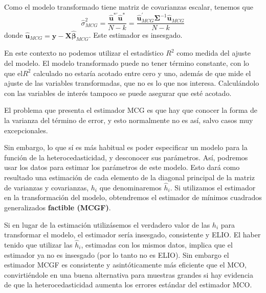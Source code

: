 
Como el modelo transformado tiene matriz de covarianzas escalar, tenemos
que 
\[
\hat{\sigma}_{MCG}^{2}=\dfrac{\hat{\boldsymbol{u}}^{*\prime}\hat{\boldsymbol{u}}^{*}}{N-k}=\dfrac{\hat{\boldsymbol{u}}_{MCG}^{\prime}\boldsymbol{\Sigma}^{-1}\hat{\boldsymbol{u}}_{MCG}}{N-k}
\]
 donde $\hat{\boldsymbol{u}}_{MCG}=\boldsymbol{y}-\boldsymbol{X}\hat{\boldsymbol{\beta}}_{MCG}$.
Este estimador es insesgado.



En este contexto no podemos utilizar el estad\'istico $R^{2}$ como
medida del ajuste del modelo. El modelo transformado puede no tener
t\'ermino constante, con lo que el$R^{2}$ calculado no estar\'ia acotado
entre cero y uno, adem\'as de que mide el ajuste de las variables transformadas,
que no es lo que nos interesa. Calcul\'andolo con las variables de inter\'es
tampoco se puede asegurar que est\'e acotado.



El problema que presenta el estimador MCG es que hay que conocer la forma de la varianza del t\'ermino de error, y esto normalmente no es as\'i, salvo casos muy excepcionales.

Sin embargo, lo que s\'i es m\'as habitual es poder especificar un modelo para la funci\'on de la heterocedasticidad, y desconocer sus par\'ametros. As\'i, podremos usar los datos para estimar los par\'ametros de este modelo. Esto dar\'a como resultado una estimaci\'on de cada elemento de la diagonal principal de la matriz de varianzas y covarianzas, $h_i$ que denominaremos $\hat{h}_i$. Si utilizamos el estimador en la transformaci\'on del modelo, obtendremos el estimador de m\'inimos cuadrados generalizados \textbf{factible (MCGF)}.

Si en lugar de la estimaci\'on utiliz\'asemos el verdadero valor de las $h_i$ para transformar el modelo, el estimador ser\'ia insesgado, consistente y ELIO. El haber tenido que utilizar las $\hat{h}_i$, estimadas con los mismos datos, implica que el estimador ya no es insesgado (por lo tanto no es ELIO). Sin embargo el estimador MCGF es consistente y asint\'oticamente m\'as eficiente que el MCO, convirti\'endole en una buena alternativa para muestras grandes si hay evidencia de que la heterocedasticidad aumenta los errores est\'andar del estimador MCO.

